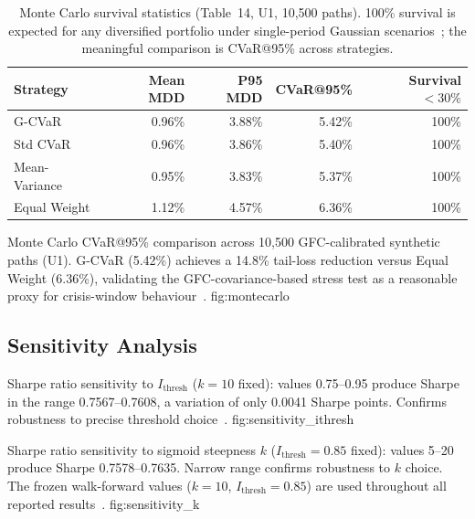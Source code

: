 \begin{table}[htbp]
\centering
\caption{Monte Carlo survival statistics (Table~14, U1, 10,500 paths).
         100\% survival is expected for any diversified portfolio under
         single-period Gaussian scenarios~\citep{jagannathan2003,glasserman2004};
         the meaningful comparison is CVaR@95\% across strategies.}
\label{tab:montecarlo}
\begin{tabular}{lrrrr}
\toprule
Strategy & Mean MDD & P95 MDD & CVaR@95\% & Survival $<30\%$ \\
\midrule
G-CVaR       & 0.96\% & 3.88\% & 5.42\% & 100\% \\
Std CVaR     & 0.96\% & 3.86\% & 5.40\% & 100\% \\
Mean-Variance& 0.95\% & 3.83\% & 5.37\% & 100\% \\
Equal Weight & 1.12\% & 4.57\% & 6.36\% & 100\% \\
\bottomrule
\end{tabular}
\end{table}

  {Monte Carlo CVaR@95\% comparison across 10,500 GFC-calibrated
   synthetic paths (U1). G-CVaR (5.42\%) achieves a 14.8\%
   tail-loss reduction versus Equal Weight (6.36\%), validating
   the GFC-covariance-based stress test as a reasonable proxy for
   crisis-window behaviour~\citep{glasserman2004,cont2001}.}
  {fig:montecarlo}

\subsection{Sensitivity Analysis}

  {Sharpe ratio sensitivity to $I_{\text{thresh}}$ ($k=10$ fixed):
   values 0.75--0.95 produce Sharpe in the range 0.7567--0.7608,
   a variation of only 0.0041 Sharpe points. Confirms robustness
   to precise threshold choice~\citep{kolm2014,harvey2016}.}
  {fig:sensitivity_ithresh}

  {Sharpe ratio sensitivity to sigmoid steepness $k$ ($I_{\text{thresh}}
   = 0.85$ fixed): values 5--20 produce Sharpe 0.7578--0.7635.
   Narrow range confirms robustness to $k$ choice. The frozen
   walk-forward values ($k=10$, $I_{\text{thresh}}=0.85$) are used
   throughout all reported results~\citep{white2000,harvey2016}.}
  {fig:sensitivity_k}

